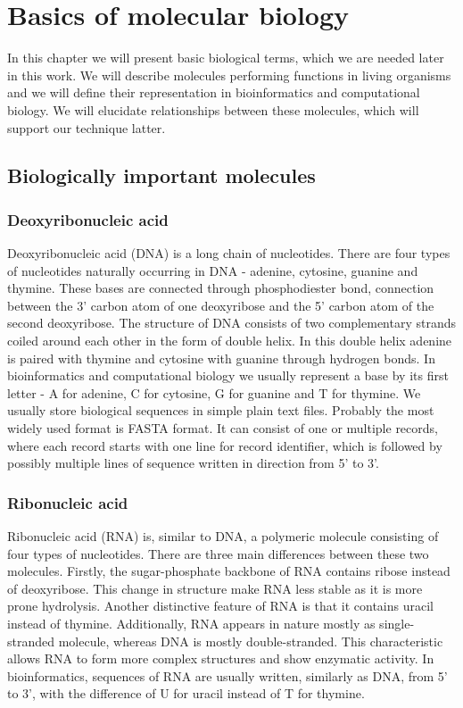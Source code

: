 \chapter{Basics of molecular biology}
In this chapter we will present basic biological terms, which we are needed later in this work.
We will describe molecules performing functions in living organisms and we will define their representation in bioinformatics and computational biology.
We will elucidate relationships between these molecules, which will support our technique latter. 

\section{Biologically important molecules}

\subsection{Deoxyribonucleic acid}
Deoxyribonucleic acid (DNA) is a long chain of nucleotides. 
There are four types of nucleotides naturally occurring in DNA - adenine, cytosine, guanine and thymine. 
These bases are connected through phosphodiester bond, connection between the 3' carbon atom of one deoxyribose and the 5' carbon atom of the second deoxyribose.
The structure of DNA consists of two complementary strands coiled around each other in the form of double helix.
In this double helix adenine is paired with thymine and cytosine with guanine through hydrogen bonds.
In bioinformatics and computational biology we usually represent a base by its first letter - A for adenine, C for cytosine, G for guanine and T for thymine.
We usually store biological sequences in simple plain text files. 
Probably the most widely used format is FASTA format.
It can consist of one or multiple records, where each record starts with one line for record identifier, which is followed by possibly multiple lines of sequence written in direction from 5' to 3'.

\subsection{Ribonucleic acid}
Ribonucleic acid (RNA) is, similar to DNA, a polymeric molecule consisting of four types of nucleotides.
There are three main differences between these two molecules.
Firstly, the sugar-phosphate backbone of RNA contains ribose instead of deoxyribose.
This change in structure make RNA less stable as it is more prone hydrolysis.
Another distinctive feature of RNA is that it contains uracil instead of thymine.
Additionally, RNA appears in nature mostly as single-stranded molecule, whereas DNA is mostly double-stranded.
This characteristic allows RNA to form more complex structures and show enzymatic activity.
In bioinformatics, sequences of RNA are usually written, similarly as DNA, from 5' to 3', with the difference of U for uracil instead of T for thymine.


